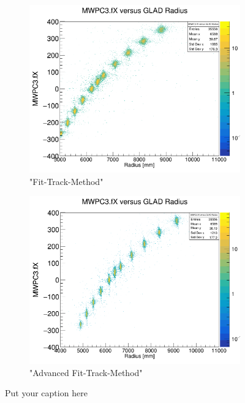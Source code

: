 \documentclass[12pt, letterpaper]{article}
\begin{document}
\begin{figure}[!htbp]
\begin{subfigure}{.5\textwidth}
\end{subfigure}
\begin{subfigure}{.5\textwidth}
  \centering
  \includegraphics[width=.9\linewidth]{plot_imgs/mw3_rho_fit.png} 
  \caption{"Fit-Track-Method"}
  \label{fig:sub-second}
\end{subfigure}
\begin{subfigure}{.5\textwidth}
  \centering
  \includegraphics[width=.9\linewidth]{plot_imgs/mw3_rho_last.png} 
  \caption{"Advanced Fit-Track-Method"}
  \label{fig:sub-second}
\end{subfigure}
\caption{Put your caption here}
\label{fig:fig}
\end{figure}
\FloatBarrier
\clearpage
\end{document}
